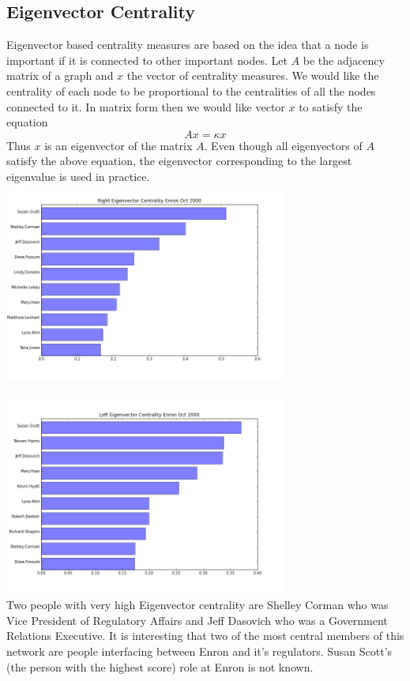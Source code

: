 \documentclass[12pt]{article}
\begin{document}
	\subsection{Eigenvector Centrality} Eigenvector based centrality measures are based on the idea that a node is important if it is connected to other important nodes. Let $A$ be the adjacency matrix of a graph and $x$ the vector of centrality measures. We would like the centrality of each node to be proportional to the centralities of all the nodes connected to it. In matrix form then we would like vector $x$ to satisfy the equation
		\begin{equation}
			A x = \kappa x
		\end{equation}
		Thus $x$ is an eigenvector of the matrix $A$. Even though all eigenvectors of $A$ satisfy the above equation, the eigenvector corresponding to the largest eigenvalue is used in practice. \\
		\includegraphics[width=0.7\textwidth]{figureRightEigOct2000} \\
		\\
		\includegraphics[width=0.7\textwidth]{figureLeftEigOct2000} \\
		
		Two people with very high Eigenvector centrality are Shelley Corman who was Vice President of Regulatory Affairs and Jeff Dasovich who was a Government Relations Executive. It is interesting that two of the most central members of this network are people interfacing between Enron and it's regulators. Susan Scott's (the person with the highest score) role at Enron is not known.\\ \\
		
\end{document}
